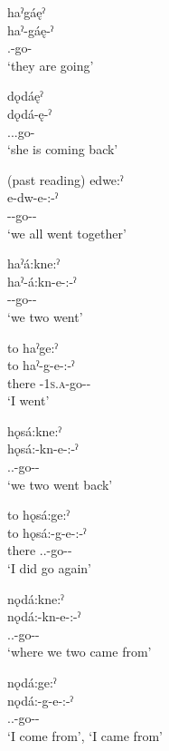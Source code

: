 \ex haˀgáęˀ\\
\gll haˀ-gáę-ˀ\\
 {\translocative.\factual}-go-{\punctual}\footnotemark{}\\
\glt `they are going'

\ex dǫdáęˀ\\
\gll dǫdá-ę-ˀ\\
 {\dualic.\factual.\cislocative}.go-{\punctual}\\
\glt `she is coming back'
\z
\z

\ea\label{ex:simplemotex12}  (past reading)
\ea edwe:ˀ\\
\gll e-dw-e-:-ˀ\\
 {\factual}--go-{\purposive}-{\punctual}\\
\glt `we all went together'

\ex haˀá:kne:ˀ\\
\gll haˀ-á:kn-e-:-ˀ\\
 {\factual}--go-{\purposive}-{\punctual}\\
\glt `we two went'

\ex to haˀge:ˀ\\
\gll to haˀ-g-e-:-ˀ\\
there {\factual}-\textsc{1s.a}-go-{\purposive}-{\punctual}\\
\glt ‘I went’

\ex hǫsá:kne:ˀ\\
\gll hǫsá:-kn-e-:-ˀ\\
{\translocative.\factual.\repetitive}-go-{\purposive}-{\punctual}\\
\glt `we two went back'

\ex to hǫsá:ge:ˀ\\
\gll to hǫsá:-g-e-:-ˀ\\
there {\translocative.\factual.\repetitive}-go-{\purposive}-{\punctual}\\
\glt `I did go again'

\ex nǫdá:kne:ˀ\\
\gll nǫdá:-kn-e-:-ˀ\\
 {\partitive.\cislocative.\factual}-go-{\purposive}-{\punctual}\\
\glt `where we two came from'

\ex nǫdá:ge:ˀ \\
\gll nǫdá:-g-e-:-ˀ\\
 {\partitive.\cislocative.\factual}-go-{\purposive}-{\punctual}\\
\glt ‘I come from’, `I came from'
\z
\z

